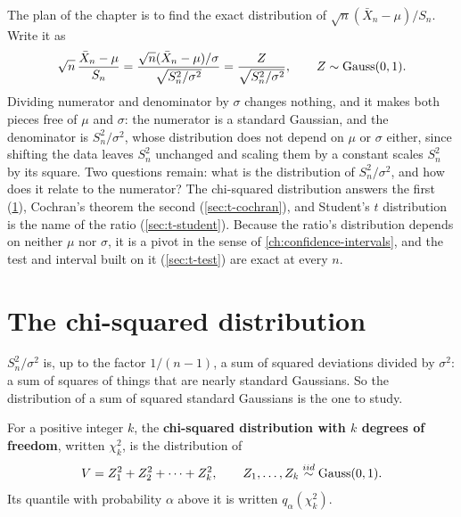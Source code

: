 The plan of the chapter is to find the exact distribution of $\sqrt{n}(\bar{X}_n - \mu)/S_n$.
Write it as
\begin{equation}
\sqrt{n}\,\frac{\bar{X}_n - \mu}{S_n} = \frac{\sqrt{n}(\bar{X}_n - \mu)/\sigma}{\sqrt{S_n^2/\sigma^2}} = \frac{Z}{\sqrt{S_n^2/\sigma^2}}, \qquad Z \sim \text{Gauss}(0, 1).
\label{eq:t-decomposition}
\end{equation}
Dividing numerator and denominator by $\sigma$ changes nothing, and it makes both pieces free of $\mu$ and $\sigma$: the numerator is a standard Gaussian, and the denominator is $S_n^2/\sigma^2$, whose distribution does not depend on $\mu$ or $\sigma$ either, since shifting the data leaves $S_n^2$ unchanged and scaling them by a constant scales $S_n^2$ by its square.
Two questions remain: what is the distribution of $S_n^2/\sigma^2$, and how does it relate to the numerator?
The chi-squared distribution answers the first (\cref{sec:t-chisq}), Cochran's theorem the second (\cref{sec:t-cochran}), and Student's $t$ distribution is the name of the ratio (\cref{sec:t-student}).
Because the ratio's distribution depends on neither $\mu$ nor $\sigma$, it is a pivot in the sense of \cref{ch:confidence-intervals}, and the test and interval built on it (\cref{sec:t-test}) are exact at every $n$.

\section{The chi-squared distribution}
\label{sec:t-chisq}

$S_n^2/\sigma^2$ is, up to the factor $1/(n-1)$, a sum of squared deviations divided by $\sigma^2$: a sum of squares of things that are nearly standard Gaussians.
So the distribution of a sum of squared standard Gaussians is the one to study.

\begin{definition}
\label{def:chisq}
For a positive integer $k$, the \textbf{chi-squared distribution with $k$ degrees of freedom}, written $\chi^2_k$, is the distribution of
\[
V = Z_1^2 + Z_2^2 + \cdots + Z_k^2, \qquad Z_1, \ldots, Z_k \stackrel{iid}{\sim} \text{Gauss}(0, 1).
\]
Its quantile with probability $\alpha$ above it is written $q_\alpha(\chi^2_k)$.
\end{definition}

